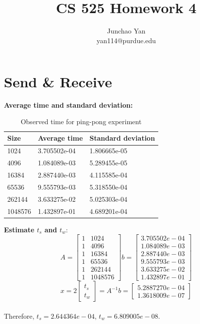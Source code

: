 \documentclass[10pt,letterpaper]{article}
\author{Junchao Yan \\ yan114@purdue.edu}
\title{CS 525 Homework 4}
\begin{document}
\maketitle
\section{Send \& Receive}
\textbf{Average time and standard deviation:}\\
\begin{table}[h]
\centering
\begin{tabular}{lll}\hline
Size    & Average time & Standard deviation \\\hline
1024    & 3.705502e-04 & 1.806665e-05       \\
4096    & 1.084089e-03 & 5.289455e-05       \\
16384   & 2.887440e-03 & 4.115585e-04       \\
65536   & 9.555793e-03 & 5.318550e-04       \\
262144  & 3.633275e-02 & 5.025303e-04       \\
1048576 & 1.432897e-01 & 4.689201e-04      \\\hline
\end{tabular}
\caption{Observed time for ping-pong experiment}
\end{table}


\textbf{Estimate $t_s$ and $t_w$}:
\begin{equation*}
A = \begin{bmatrix}
1 & 1024\\
1 & 4096\\
1 & 16384\\
1 & 65536\\
1 & 262144\\
1 & 1048576
\end{bmatrix}
b = \begin{bmatrix}
3.705502e-04\\
1.084089e-03\\
2.887440e-03\\
9.555793e-03\\
3.633275e-02\\
1.432897e-01
\end{bmatrix}
\end{equation*}
\begin{equation*}
x = 2\begin{bmatrix}
t_s\\
t_w
\end{bmatrix} = A^{-1}b = 
\begin{bmatrix}
5.2887270e-04\\
1.3618009e-07
\end{bmatrix}
\end{equation*}\\[5pt]
Therefore, $t_s = 2.644364e-04$, $t_w = 6.809005e-08$.
\end{document}
